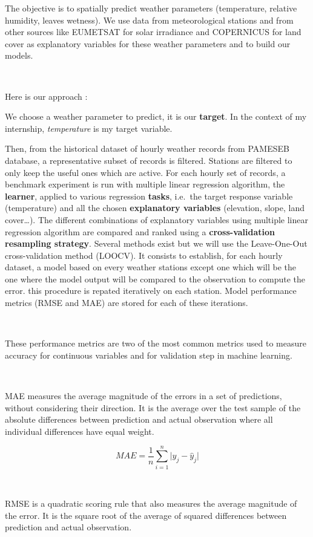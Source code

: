 \documentclass[12pt,twoside]{reedthesis}
\theoremstyle{definition}
\theoremstyle{definition}
\theoremstyle{definition}
\theoremstyle{remark}
\begin{document}
The objective is to spatially predict weather parameters (temperature,
relative humidity, leaves wetness). We use data from meteorological
stations and from other sources like EUMETSAT for solar irradiance and
COPERNICUS for land cover as explanatory variables for these weather
parameters and to build our models.

~

Here is our approach :

We choose a weather parameter to predict, it is our \textbf{target}. In
the context of my internship, \emph{temperature} is my target variable.

Then, from the historical dataset of hourly weather records from PAMESEB
database, a representative subset of records is filtered. Stations are
filtered to only keep the useful ones which are active. For each hourly
set of records, a benchmark experiment is run with multiple linear
regression algorithm, the \textbf{learner}, applied to various
regression \textbf{tasks}, i.e.~the target response variable
(temperature) and all the chosen \textbf{explanatory variables}
(elevation, slope, land cover\ldots{}). The different combinations of
explanatory variables using multiple linear regression algorithm are
compared and ranked using a \textbf{cross-validation resampling
strategy}. Several methods exist but we will use the Leave-One-Out
cross-validation method (LOOCV). It consists to establish, for each
hourly dataset, a model based on every weather stations except one which
will be the one where the model output will be compared to the
observation to compute the error. this procedure is repated iteratively
on each station. Model performance metrics (RMSE and MAE) are stored for
each of these iterations.

~

These performance metrics are two of the most common metrics used to
measure accuracy for continuous variables and for validation step in
machine learning.

~

MAE measures the average magnitude of the errors in a set of
predictions, without considering their direction. It is the average over
the test sample of the absolute differences between prediction and
actual observation where all individual differences have equal weight.

\[
MAE = \frac{1}{n} \sum_{i=1}^{n}{ \lvert y_{j} - \widehat{y}_{j} \rvert}
\]

~ ~

RMSE is a quadratic scoring rule that also measures the average
magnitude of the error. It is the square root of the average of squared
differences between prediction and actual observation.
\end{document}
